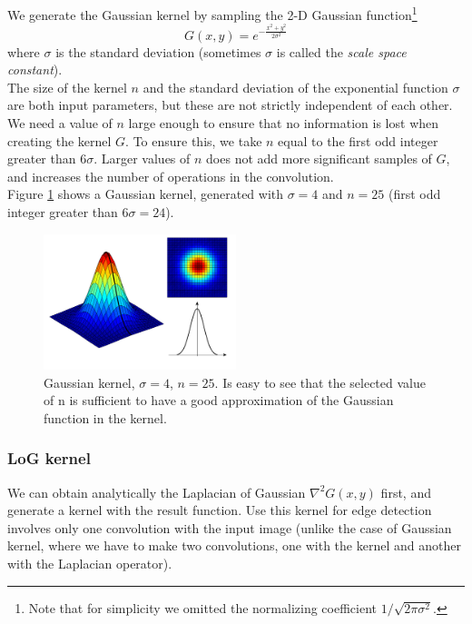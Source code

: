 \documentclass{ipol}
\numberwithin{equation}{section}
\numberwithin{table}{section}
\numberwithin{figure}{section}
\begin{document}
We generate the Gaussian kernel by sampling the 2-D Gaussian function\footnote{Note that for simplicity 
we omitted the normalizing coefficient $1/\sqrt{2\pi\sigma^2}$.}
\begin{equation}
	\label{eq:gaussian_function}
	G(x,y) = e^{-\frac{x^2+y^2}{2\sigma^2}}
\end{equation}
where $\sigma$ is the standard deviation (sometimes $\sigma$ is called the \textit{scale space constant}).\\

The size of the kernel $n$ and the standard deviation of the exponential function $\sigma$ are both 
input parameters, but these are not strictly independent of each other. We need a value 
of $n$ large enough to ensure that no information is lost when creating the kernel $G$. To ensure this, we take 
$n$ equal to the first odd integer greater than $6\sigma$. Larger values of $n$ does not add more 
significant samples ​​of $G$, and increases the number of operations in the convolution.\\

Figure \ref{fig:gaussian_kernel} shows a Gaussian kernel, generated with $\sigma = 4$ and $n = 25$ 
(first odd integer greater than $6\sigma=24$).\\

\begin{figure}
	\centering
	\includegraphics[width=0.5\textwidth]{kernel_gaussian.pdf}
	\caption{Gaussian kernel, $\sigma=4$, $n=25$. Is easy to see that the selected value of n is 
sufficient to have a good approximation of the Gaussian function in the kernel.}
	\label{fig:gaussian_kernel}
\end{figure}

\subsubsection{LoG kernel}

We can obtain analytically the Laplacian of Gaussian $\nabla^2G(x,y)$ first, and generate a kernel 
with the result function. Use this kernel for edge detection involves only one convolution with 
the input image (unlike the case of Gaussian kernel, where we have to make two convolutions, one 
with the kernel and another with the Laplacian operator).\\
\end{document}
